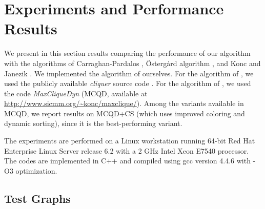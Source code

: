\section{Experiments and Performance Results}
\label{sec:experiments}

We present in this section results comparing the performance of our algorithm
with the algorithms of Carraghan-Pardalos \cite{pardalos}, 
\"{O}sterg\.{a}rd algorithm \cite{ostergard}, and
Konc and Janezik \cite{konc2007improved}. We implemented the algorithm of \cite{pardalos} ourselves. 
For the algorithm of \cite{ostergard},  we used the publicly available {\it cliquer} source code \cite{cliquer}.
For the algorithm of \cite{konc2007improved}, we used the code {\it MaxCliqueDyn} 
(MCQD, available at {\small \url{http://www.sicmm.org/~konc/maxclique/}}). 
Among the variants available in MCQD, we report results on 
MCQD+CS (which uses improved coloring and dynamic sorting),
since it is the best-performing variant.  

The experiments are performed on a Linux workstation running 64-bit Red Hat Enterprise Linux Server release 6.2 with a 2 GHz Intel Xeon E7540 processor. The codes are implemented in C++ and compiled using gcc version 4.4.6 with -O3 optimization.


\subsection{Test Graphs}

